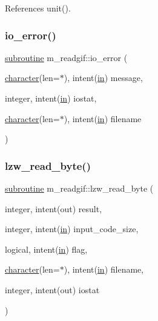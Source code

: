 References unit().

\mbox{\label{namespacem__readgif_ae01d3edbe9e15bf4dd33070581e26fee}} 
\subsubsection{\texorpdfstring{io\+\_\+error()}{io\_error()}}
{\footnotesize\ttfamily \hyperlink{M__stopwatch_83_8txt_acfbcff50169d691ff02d4a123ed70482}{subroutine} m\+\_\+readgif\+::io\+\_\+error (\begin{DoxyParamCaption}\item[{\hyperlink{option__stopwatch_83_8txt_abd4b21fbbd175834027b5224bfe97e66}{character}(len=$\ast$), intent(\hyperlink{M__journal_83_8txt_afce72651d1eed785a2132bee863b2f38}{in})}]{message,  }\item[{integer, intent(\hyperlink{M__journal_83_8txt_afce72651d1eed785a2132bee863b2f38}{in})}]{iostat,  }\item[{\hyperlink{option__stopwatch_83_8txt_abd4b21fbbd175834027b5224bfe97e66}{character}(len=$\ast$), intent(\hyperlink{M__journal_83_8txt_afce72651d1eed785a2132bee863b2f38}{in})}]{filename }\end{DoxyParamCaption})\hspace{0.3cm}{\ttfamily [private]}}

\mbox{\label{namespacem__readgif_a314e657d0662360266bac5702a657ef1}} 
\subsubsection{\texorpdfstring{lzw\+\_\+read\+\_\+byte()}{lzw\_read\_byte()}}
{\footnotesize\ttfamily \hyperlink{M__stopwatch_83_8txt_acfbcff50169d691ff02d4a123ed70482}{subroutine} m\+\_\+readgif\+::lzw\+\_\+read\+\_\+byte (\begin{DoxyParamCaption}\item[{integer, intent(out)}]{result,  }\item[{integer, intent(\hyperlink{M__journal_83_8txt_afce72651d1eed785a2132bee863b2f38}{in})}]{input\+\_\+code\+\_\+size,  }\item[{logical, intent(\hyperlink{M__journal_83_8txt_afce72651d1eed785a2132bee863b2f38}{in})}]{flag,  }\item[{\hyperlink{option__stopwatch_83_8txt_abd4b21fbbd175834027b5224bfe97e66}{character}(len=$\ast$), intent(\hyperlink{M__journal_83_8txt_afce72651d1eed785a2132bee863b2f38}{in})}]{filename,  }\item[{integer, intent(out)}]{iostat }\end{DoxyParamCaption})\hspace{0.3cm}{\ttfamily [private]}}



